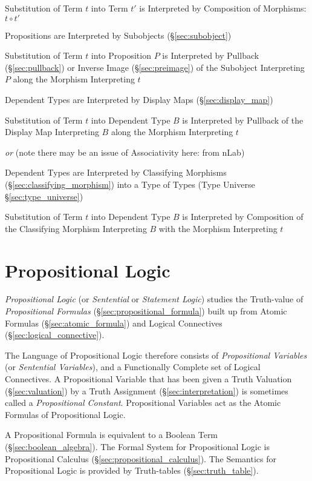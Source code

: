 Substitution of Term $t$ into Term $t'$ is Interpreted by Composition
of Morphisms: $t \circ t'$

Propositions are Interpreted by Subobjects (\S\ref{sec:subobject})

Substitution of Term $t$ into Proposition $P$ is Interpreted by
Pullback (\S\ref{sec:pullback}) or Inverse Image
(\S\ref{sec:preimage}) of the Subobject Interpreting $P$ along the
Morphism Interpreting $t$

Dependent Types are Interpreted by Display Maps
(\S\ref{sec:display_map})

Substitution of Term $t$ into Dependent Type $B$ is Interpreted by
Pullback of the Display Map Interpreting $B$ along the Morphism
Interpreting $t$

\emph{or} (note there may be an issue of Associativity here: from nLab)

Dependent Types are Interpreted by Classifying Morphisms
(\S\ref{sec:classifying_morphism}) into a Type of Types (Type Universe
\S\ref{sec:type_universe})

Substitution of Term $t$ into Dependent Type $B$ is Interpreted by
Composition of the Classifying Morphism Interpreting $B$ with the
Morphism Interpreting $t$



\section{Propositional Logic}\label{sec:propositional_logic}

\emph{Propositional Logic} (or \emph{Sentential} or \emph{Statement
  Logic}) studies the Truth-value of \emph{Propositional Formulas}
(\S\ref{sec:propositional_formula}) built up from Atomic Formulas
(\S\ref{sec:atomic_formula}) and Logical Connectives
(\S\ref{sec:logical_connective}).

The Language of Propositional Logic therefore consists of
\emph{Propositional Variables} (or \emph{Sentential Variables}), and a
Functionally Complete set of Logical Connectives. A Propositional
Variable that has been given a Truth Valuation (\S\ref{sec:valuation})
by a Truth Assignment (\S\ref{sec:interpretation}) is sometimes called
a \emph{Propositional Constant}. Propositional Variables act as the
Atomic Formulas of Propositional Logic.

A Propositional Formula is equivalent to a Boolean Term
(\S\ref{sec:boolean_algebra}). The Formal System for Propositional
Logic is Propositional Calculus (\S\ref{sec:propositional_calculus}).
The Semantics for Propositional Logic is provided by Truth-tables
(\S\ref{sec:truth_table}).

